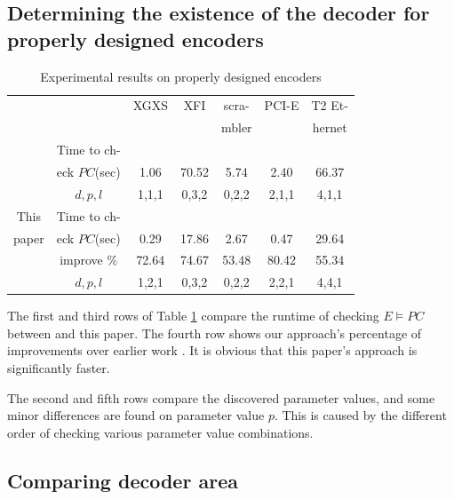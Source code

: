 \documentclass[journal]{IEEEtran}
\begin{document}
\subsection{Determining the existence of the decoder for properly designed encoders}\label{subsec_prop}
\begin{table}[b]
\centering
\caption{Experimental results on properly designed encoders}
\begin{tabular}{|c|c|c|c|c|c|c|}
\hline
&                                        &XGXS     &XFI       &scra-     &PCI-E    &T2 Et-\\
&                                        &         &          &mbler     &        &hernet\\ \hline
&Time to ch-                           &&&&&\\
\cite{ShengYuShen:fmcad10}&eck $PC$(sec) &1.06     &70.52     &5.74      &2.40    &66.37\\\cline{2-7}
&$d,p,l$                                 &1,1,1    &0,3,2     &0,2,2     &2,1,1   &4,1,1         \\ \hline\hline
This&Time to ch-                         &&&&&\\
paper&eck $PC$(sec)                      &0.29     &17.86     &2.67      &0.47    &29.64\\\cline{2-7}
     &improve \%                         &72.64    &74.67     &53.48     &80.42   &55.34 \\\cline{2-7}
&$d,p,l$                                 &1,2,1    &0,3,2     &0,2,2     &2,2,1   &4,4,1          \\ \hline
\end{tabular}\label{tab_prodes}
\end{table}

The first and third rows of Table \ref{tab_prodes} compare the runtime of checking $E\vDash PC$ between \cite{ShengYuShen:fmcad10} and this paper.
The fourth row shows our approach's percentage of improvements over earlier work \cite{ShengYuShen:fmcad10}.
It is obvious that this paper's approach is significantly faster.

The second and fifth rows compare the discovered parameter values,
and some minor differences are found on parameter value $p$.
This is caused by the different order of checking various parameter value combinations.

\subsection{Comparing decoder area}\label{subsec_area}
\end{document}
